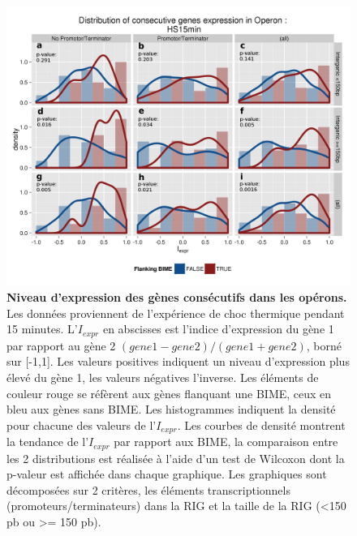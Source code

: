 \documentclass[12pt,a4paper]{report}
\begin{document}
\begin{onehalfspace}
\begin{figure}[!h]
\centerline{\includegraphics[scale=0.82]{figures/genesOperon_histoDens.png}}
\caption{\textbf{Niveau d'expression des gènes consécutifs dans les opérons.} Les données proviennent de l'expérience de choc thermique pendant 15 minutes. L'$I_{expr}$ en abscisses est l'indice d'expression du gène 1 par rapport au gène 2 $(gene1 - gene2) / (gene1 + gene2)$, borné sur [-1,1]. Les valeurs positives indiquent un niveau d'expression plus élevé du gène 1, les valeurs négatives l'inverse. Les éléments de couleur rouge se réfèrent aux gènes flanquant une BIME, ceux en bleu aux gènes sans BIME. Les histogrammes indiquent la densité pour chacune des valeurs de l'$I_{expr}$. Les courbes de densité montrent la tendance de l'$I_{expr}$ par rapport aux BIME, la comparaison entre les 2 distributions est réalisée à l'aide d'un test de Wilcoxon dont la p-valeur est affichée dans chaque graphique. Les graphiques sont décomposées sur 2 critères, les éléments transcriptionnels (promoteurs/terminateurs) dans la RIG et la taille de la RIG (<150 pb ou >= 150 pb).}
\label{fig:expression_operon}
\end{figure}


\end{onehalfspace}
\end{document}
